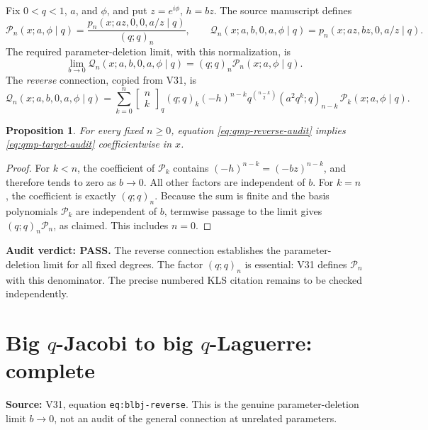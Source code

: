 \documentclass[11pt]{article}
\newtheorem{proposition}{Proposition}
\begin{document}
Fix $0<q<1$, $a$, and $\phi$, and put $z=e^{i\phi}$, $h=bz$. The source manuscript defines
\[
\mathscr P_n(x;a,\phi\mid q)=\frac{p_n(x;az,0,0,a/z\mid q)}{(q;q)_n},\qquad
\mathscr Q_n(x;a,b,0,a,\phi\mid q)=p_n(x;az,bz,0,a/z\mid q).
\]
The required parameter-deletion limit, with this normalization, is
\begin{equation}\label{eq:qmp-target-audit}
\lim_{b\to0}\mathscr Q_n(x;a,b,0,a,\phi\mid q)
=(q;q)_n\mathscr P_n(x;a,\phi\mid q).
\end{equation}
The \emph{reverse} connection, copied from V31, is
\begin{equation}\label{eq:qmp-reverse-audit}
\mathscr Q_n(x;a,b,0,a,\phi\mid q)
=\sum_{k=0}^{n}\begin{bmatrix}n\\k\end{bmatrix}_q
(q;q)_k(-h)^{n-k}q^{\binom{n-k}{2}}
(a^2q^k;q)_{n-k}\,\mathscr P_k(x;a,\phi\mid q).
\end{equation}
\begin{proposition}
For every fixed $n\ge0$, equation \eqref{eq:qmp-reverse-audit} implies \eqref{eq:qmp-target-audit} coefficientwise in $x$.
\end{proposition}
\begin{proof}
For $k<n$, the coefficient of $\mathscr P_k$ contains $(-h)^{n-k}=(-bz)^{n-k}$, and therefore tends to zero as $b\to0$. All other factors are independent of $b$. For $k=n$, the coefficient is exactly $(q;q)_n$. Because the sum is finite and the basis polynomials $\mathscr P_k$ are independent of $b$, termwise passage to the limit gives $(q;q)_n\mathscr P_n$, as claimed. This includes $n=0$.
\end{proof}
\noindent\textbf{Audit verdict: PASS.} The reverse connection establishes the parameter-deletion limit for all fixed degrees. The factor $(q;q)_n$ is essential: V31 defines $\mathscr P_n$ with this denominator. The precise numbered KLS citation remains to be checked independently.


\section{Big $q$-Jacobi to big $q$-Laguerre: complete}
\noindent\textbf{Source:} V31, equation \texttt{eq:blbj-reverse}. This is the genuine parameter-deletion limit $b\to0$, not an audit of the general connection at unrelated parameters.
\end{document}
